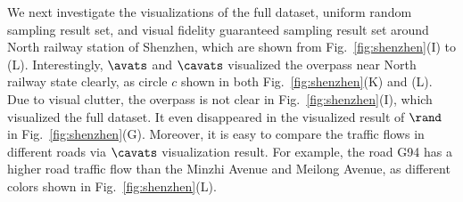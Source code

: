 We next investigate the visualizations of the full dataset, uniform random sampling result set, and visual fidelity guaranteed sampling result set around North railway station of Shenzhen, which are shown from Fig.~\ref{fig:shenzhen}(I) to (L).
Interestingly, $\avats$ and $\cavats$ visualized the overpass near North railway state clearly, as circle $c$ shown in both Fig.~\ref{fig:shenzhen}(K) and (L).
Due to visual clutter, the overpass is not clear in Fig.~\ref{fig:shenzhen}(I), which visualized the full dataset.
It even disappeared in the visualized result of $\rand$ in Fig.~\ref{fig:shenzhen}(G).
Moreover, it is easy to compare the traffic flows in different roads via $\cavats$ visualization result.
For example, the road G94 has a higher road traffic flow than the Minzhi Avenue and Meilong Avenue, as different colors shown in Fig.~\ref{fig:shenzhen}(L).




